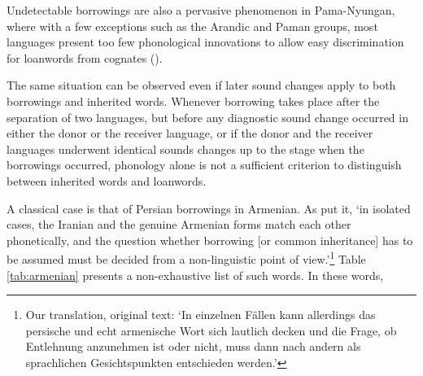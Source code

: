 \documentclass[svgnames,12pt]{scrartcl}
\newcommand{\ipa}[1]{\textbf{{\phon\mbox{#1}}}}
\begin{document}

Undetectable borrowings are also a pervasive phenomenon in Pama-Nyungan, where with a few exceptions such as the Arandic and Paman groups, most languages present too few phonological innovations to allow easy discrimination for loanwords from cognates (\citealt[46]{koch04method}).

The same situation can be observed even if later sound changes apply to both borrowings and inherited words. Whenever borrowing takes place after the separation of two languages, but before any diagnostic sound change occurred in either the donor or the receiver language, or if the donor and the receiver languages underwent identical sounds changes up to the stage when the borrowings occurred, phonology alone is not a sufficient criterion to distinguish between inherited words and loanwords. 
 
A classical case is that of Persian borrowings in Armenian. As
\citet[16-17]{huebschmann97armenische} put it, `in isolated cases, the Iranian and the genuine Armenian forms match each other phonetically, and the question whether borrowing [or common inheritance] has to be assumed must be decided from a non-linguistic point of view.'\footnote{Our
translation, original text: `In einzelnen Fällen kann allerdings das persische und echt armenische Wort sich lautlich decken und die Frage, ob Entlehnung anzunehmen ist oder nicht, muss dann nach andern als sprachlichen Gesichtspunkten entschieden werden.'} Table \ref{tab:armenian} presents a non-exhaustive list of such words. In these words, 
 
\end{document}
